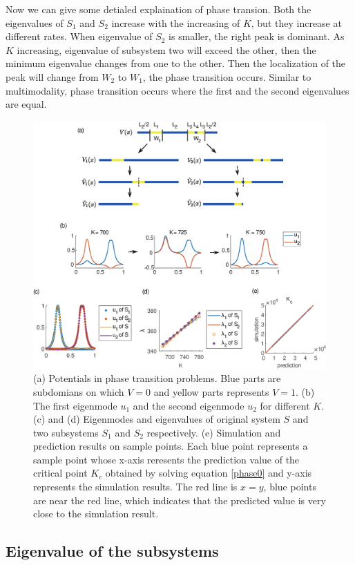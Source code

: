 \documentclass[a4paper,11pt]{article}
\begin{document}
Now we can give some detialed explaination of phase transion. Both the eigenvalues of $S_1$ and $S_2$ increase with the increasing of $K$, but they increase at different rates. When eigenvalue of $S_2$ is smaller, the right peak is dominant. As $K$ increasing, eigenvalue of subsystem two will exceed the other, then the minimum eigenvalue changes from one to the other. Then the localization of the peak will change from $W_2$ to $W_1$, the phase transition occurs. Similar to multimodality, phase transition occurs where the first and the second eigenvalues are equal.

\begin{figure}
\centering
\includegraphics[width=\linewidth]{Fig5.eps}
\caption{(a) Potentials in phase transition problems. Blue parts are subdomians on which $V = 0$ and yellow parts represents $V = 1$. (b) The first eigenmode $u_1$ and the second eigenmode $u_2$ for different $K$. (c) and (d) Eigenmodes and eigenvalues of original system $S$ and two subsystems $S_1$ and $S_2$ respectively. (e) Simulation and prediction results on sample points. Each blue point represents a sample point whose x-axis reresents the prediction value of the critical point $K_c$ obtained by solving equation \eqref{phase0} and y-axis represents the simulation results. The red line is $x=y$, blue points are near the red line, which indicates that the predicted value is very close to the simulation result.}
\label{fig5}
\end{figure}

\subsection{Eigenvalue of the subsystems}
\end{document}
